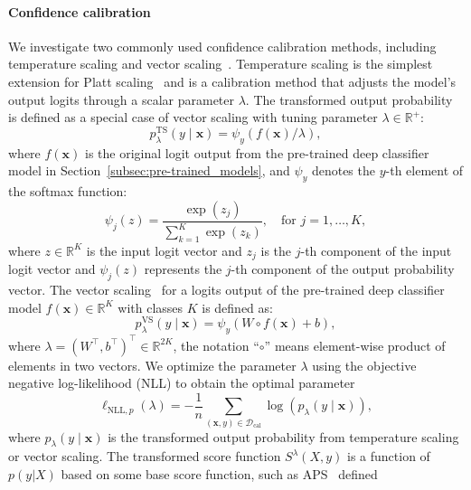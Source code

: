 \documentclass{article}
\newcommand{\1}{\mathbbm{1}}
\theoremstyle{plain}
\theoremstyle{definition}
\theoremstyle{remark}
\begin{document}
\paragraph{Confidence calibration} 
We investigate two commonly used confidence calibration methods, including temperature scaling and vector scaling~\citep{guo2017calibration, xi2024does, dabah2024temperature}. 
Temperature scaling is the simplest extension for Platt scaling~\citep{platt1999probabilistic} and is a calibration method that adjusts the model's output logits through a scalar parameter $\lambda$.
The transformed output probability is defined as a special case of vector scaling with tuning parameter $\lambda \in \mathbb{R}^{+}$:
\begin{equation}
    \label{eq:ts}
    p^{\text{TS}}_{\lambda}(y\mid \boldsymbol{x}) = \psi_y(f(\boldsymbol{x})/\lambda),
\end{equation}
where $f(\boldsymbol{x})$ is the original logit output from the pre-trained deep classifier model in Section~\ref{subsec:pre-trained_models}, and $\psi_y$ denotes the $y$-th element of the softmax function:
\begin{equation}
    \label{eq:softmax}
    \psi_j(z) = \frac{\exp(z_j)}{\sum_{k=1}^K \exp(z_k)}, \quad \text{for } j=1,\ldots,K,
\end{equation}
where $z \in \mathbb{R}^K$ is the input logit vector and \(z_j\) is the $j$-th component of the input logit vector and $\psi_j(z)$ represents the $j$-th component of the output probability vector.  
The vector scaling~\citep{guo2017calibration} for a logits output of the pre-trained deep classifier model $f(\boldsymbol{x}) \in \mathbb{R}^K$ with classes \(K\) is defined as:
\begin{equation}
    \label{eq:vs}
    p^{\text{VS}}_{\lambda}(y\mid \boldsymbol{x}) = \psi_y(W \circ f(\boldsymbol{x}) + b),
\end{equation}
where \(\lambda = (W^\top, b^\top)^\top\in \mathbb{R}^{2K}\), the notation ``\(\circ\)'' means element-wise product of elements in two vectors.
We optimize the parameter \(\lambda\) using the objective negative log-likelihood (NLL) to obtain the optimal parameter 
\begin{equation*}
\ell_{\text{NLL}, p}(\lambda) = -\frac{1}{n}\sum_{(\boldsymbol{x},y)\in\mathcal{D}_{\text{cal}}} \log  (p_{\lambda}(y\mid \boldsymbol{x})),
\end{equation*}
where \(p_{\lambda}(y\mid \boldsymbol{x})\) is the transformed output probability from temperature scaling or vector scaling.
The transformed score function \(S^{\lambda}(X,y)\) is a function of \(p(y |X )\) based on some base score function, such as APS~\citep{romano2020classification} defined 
\end{document}
